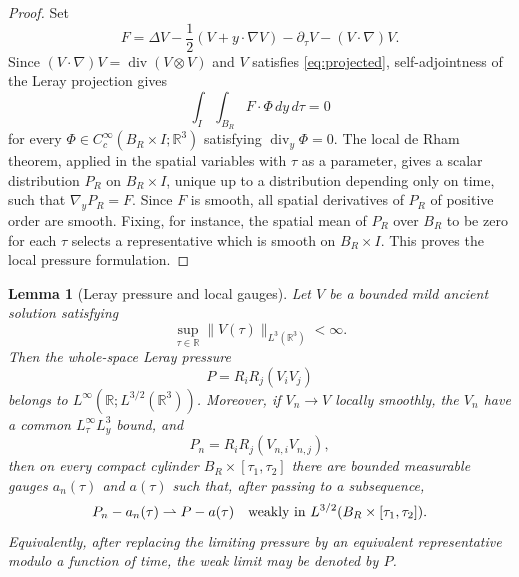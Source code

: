 \documentclass[11pt]{amsart}
\theoremstyle{plain}
\newtheorem{lemma}[theorem]{Lemma}
\theoremstyle{definition}
\theoremstyle{remark}
\numberwithin{equation}{section}
\newcommand{\R}{\mathbb R}
\newcommand{\divergence}{\operatorname{div}}
\begin{document}
\begin{proof}
Set
\[
   F=
   \Delta V-\frac12(V+y\cdot\nabla V)
   -\partial_\tau V-(V\cdot\nabla)V .
\]
Since \((V\cdot\nabla)V=\divergence(V\otimes V)\) and \(V\) satisfies
\eqref{eq:projected}, self-adjointness of the Leray projection gives
\[
   \int_I\int_{B_R}F\cdot\Phi\,dy\,d\tau=0
\]
for every \(\Phi\in C_c^\infty(B_R\times I;\R^3)\) satisfying
\(\divergence_y\Phi=0\).  The local de Rham theorem, applied in the spatial
variables with \(\tau\) as a parameter, gives a scalar distribution \(P_R\) on
\(B_R\times I\), unique up to a distribution depending only on time, such that
\(\nabla_yP_R=F\).  Since \(F\) is smooth, all spatial derivatives of \(P_R\)
of positive order are smooth.  Fixing, for instance, the spatial mean of
\(P_R\) over \(B_R\) to be zero for each \(\tau\) selects a representative
which is smooth on \(B_R\times I\).  This proves the local pressure
formulation.
\end{proof}

\begin{lemma}[Leray pressure and local gauges]\label{lem:pressure-reconstruction}
Let \(V\) be a bounded mild ancient solution satisfying
\[
   \sup_{\tau\in\R}\|V(\tau)\|_{L^3(\R^3)}<\infty .
\]
Then the whole-space Leray pressure
\[
   P=R_iR_j(V_iV_j)
\]
belongs to \(L^\infty(\R;L^{3/2}(\R^3))\).  Moreover, if \(V_n\to V\) locally
smoothly, the \(V_n\) have a common \(L^\infty_\tau L^3_y\) bound, and
\[
   P_n=R_iR_j(V_{n,i}V_{n,j}),
\]
then on every compact cylinder \(B_R\times[\tau_1,\tau_2]\) there are bounded
measurable gauges \(a_n(\tau)\) and \(a(\tau)\) such that, after passing to a
subsequence,
\[
   P_n-a_n(\tau)
   \rightharpoonup P-a(\tau)
   \quad\hbox{weakly in }L^{3/2}(B_R\times[\tau_1,\tau_2]).
\]
Equivalently, after replacing the limiting pressure by an equivalent
representative modulo a function of time, the weak limit may be denoted by
\(P\).
\end{lemma}
\end{document}
